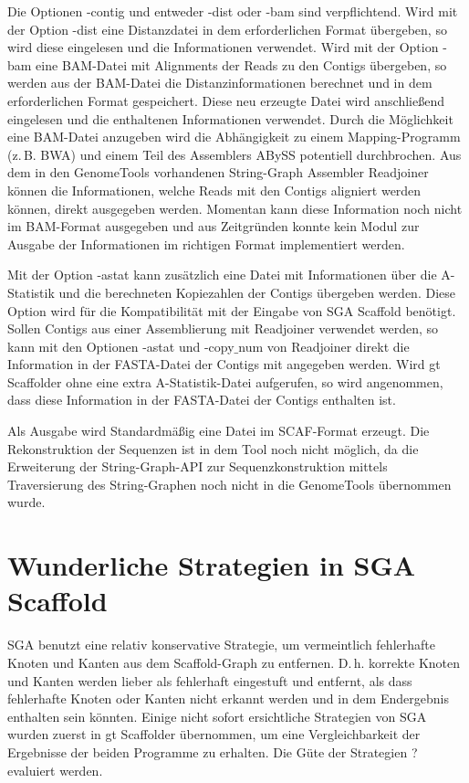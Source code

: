 \documentclass[a4paper,10pt,parskip]{scrartcl}
\begin{document}
Die Optionen -contig und entweder -dist oder -bam sind
verpflichtend. Wird mit der Option -dist eine Distanzdatei in dem
erforderlichen Format übergeben, so wird diese eingelesen und die
Informationen verwendet. Wird mit der Option -bam eine BAM-Datei mit
Alignments der Reads zu den Contigs übergeben, so werden aus der
BAM-Datei die Distanzinformationen berechnet und in dem erforderlichen
Format gespeichert. Diese neu erzeugte Datei wird anschließend
eingelesen und die enthaltenen Informationen verwendet. Durch die
Möglichkeit eine BAM-Datei anzugeben wird die Abhängigkeit zu einem
Mapping-Programm (z.\,B. BWA) und einem Teil des Assemblers ABySS
potentiell durchbrochen. Aus dem in den GenomeTools vorhandenen
String-Graph Assembler Readjoiner können die Informationen, welche
Reads mit den Contigs aligniert werden können, direkt ausgegeben
werden. Momentan kann diese Information noch nicht im BAM-Format
ausgegeben und aus Zeitgründen konnte kein Modul zur Ausgabe
der Informationen im richtigen Format implementiert werden.

Mit der Option -astat kann zusätzlich eine Datei mit Informationen
über die A-Statistik und die berechneten Kopiezahlen der Contigs
übergeben werden. Diese Option wird für die Kompatibilität mit der
Eingabe von SGA Scaffold benötigt. Sollen Contigs aus einer
Assemblierung mit Readjoiner verwendet werden, so kann mit den
Optionen -astat und -copy$\_$num von Readjoiner direkt die Information
in der FASTA-Datei der Contigs mit angegeben werden. Wird gt
Scaffolder ohne eine extra A-Statistik-Datei aufgerufen, so wird
angenommen, dass diese Information in der FASTA-Datei der Contigs
enthalten ist.

Als Ausgabe wird Standardmäßig eine Datei im SCAF-Format erzeugt. Die
Rekonstruktion der Sequenzen ist in dem Tool noch nicht möglich, da
die Erweiterung der String-Graph-API zur Sequenzkonstruktion mittels
Traversierung des String-Graphen noch nicht in die GenomeTools
übernommen wurde.

\section{Wunderliche Strategien in SGA Scaffold}

SGA benutzt eine relativ konservative Strategie, um vermeintlich
fehlerhafte Knoten und Kanten aus dem Scaffold-Graph zu
entfernen. D.\,h. korrekte Knoten und Kanten werden lieber als
fehlerhaft eingestuft und entfernt, als dass fehlerhafte Knoten oder
Kanten nicht erkannt werden und in dem Endergebnis enthalten sein
könnten. Einige nicht sofort ersichtliche Strategien von SGA wurden
zuerst in gt Scaffolder übernommen, um eine Vergleichbarkeit der
Ergebnisse der beiden Programme zu erhalten. Die Güte der Strategien
? evaluiert werden.
\end{document}
